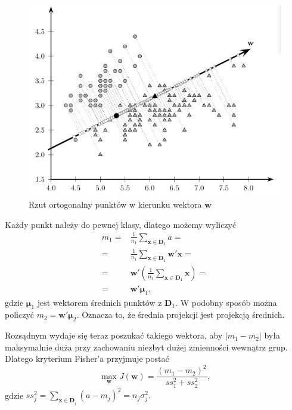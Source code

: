 \documentclass[
]{book}
\theoremstyle{plain}
\theoremstyle{definition}
\theoremstyle{definition}
\theoremstyle{definition}
\theoremstyle{definition}
\theoremstyle{remark}
\begin{document}
\begin{figure}

{\centering \includegraphics[width=5.83in]{images/rzut} 

}

\caption{Rzut ortogonalny punktów w kierunku wektora $\boldsymbol w$}\label{fig:rzut}
\end{figure}

Każdy punkt należy do pewnej klasy, dlatego możemy wyliczyć
\begin{align}
    m_1=&\frac{1}{n_1}\sum_{ \boldsymbol x\in \boldsymbol D_1}a=\\
    =&\frac{1}{n_1}\sum_{ \boldsymbol x\in \boldsymbol D_1} \boldsymbol w' \boldsymbol x=\\
    =& \boldsymbol w'\left(\frac{1}{n_1}\sum_{ \boldsymbol x\in \boldsymbol D_1} \boldsymbol x \right)=\\
    =& \boldsymbol w' \boldsymbol{\mu}_1,
    \label{eq:m}
\end{align}
gdzie \(\boldsymbol \mu_1\) jest wektorem średnich punktów z \(\boldsymbol D_1\). W podobny sposób można policzyć \(m_2 = \boldsymbol w' \boldsymbol \mu_2\). Oznacza to, że średnia projekcji jest projekcją średnich.

Rozsądnym wydaje się teraz poszukać takiego wektora, aby \(|m_1-m_2|\) była maksymalnie duża przy zachowaniu niezbyt dużej zmienności wewnątrz grup. Dlatego kryterium Fisher'a przyjmuje postać
\begin{equation}
    \max_{ \boldsymbol w}J(\boldsymbol w)=\frac{(m_1-m_2)^2}{ss_1^2+ss_2^2},
    \label{eq:condFisher}
\end{equation}
gdzie \(ss_j^2=\sum_{ \boldsymbol x\in \boldsymbol D_j}(a-m_j)^2=n_j\sigma_j^2.\)
\end{document}

